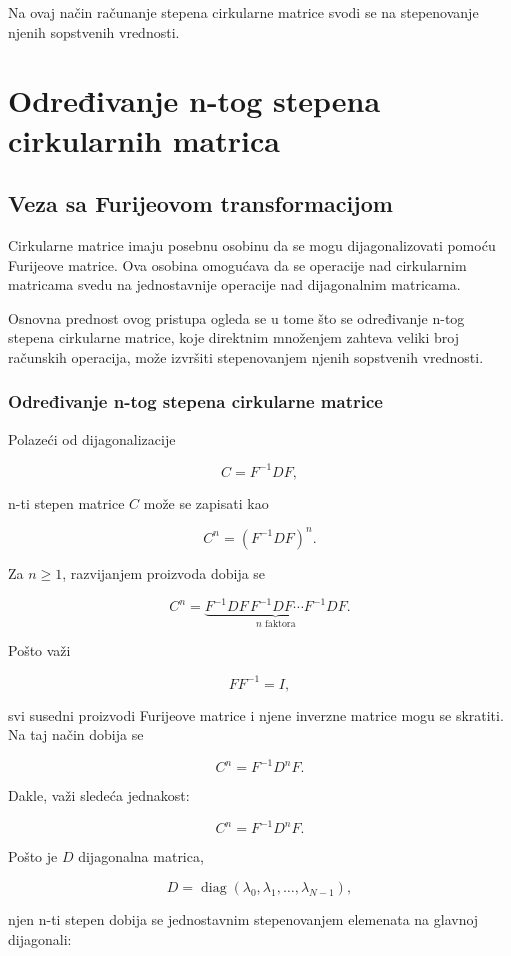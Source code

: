 \documentclass[12pt,a4paper]{report}
\begin{document}
Na ovaj način računanje stepena cirkularne matrice
svodi se na stepenovanje njenih sopstvenih vrednosti.

 
\chapter{Određivanje n-tog stepena cirkularnih matrica}

\section{Veza sa Furijeovom transformacijom}

Cirkularne matrice imaju posebnu osobinu da se mogu dijagonalizovati pomoću Furijeove matrice. Ova osobina omogućava da se operacije nad cirkularnim matricama svedu na jednostavnije operacije nad dijagonalnim matricama.

Osnovna prednost ovog pristupa ogleda se u tome što se određivanje n-tog stepena cirkularne matrice, koje direktnim množenjem zahteva veliki broj računskih operacija, može izvršiti stepenovanjem njenih sopstvenih vrednosti.

\subsection{Određivanje n-tog stepena cirkularne matrice}

Polazeći od dijagonalizacije

\[
C=F^{-1}DF,
\]

n-ti stepen matrice \(C\) može se zapisati kao

\[
C^n=(F^{-1}DF)^n.
\]

Za \(n\geq 1\), razvijanjem proizvoda dobija se

\[
C^n=
\underbrace{F^{-1}DF\,F^{-1}DF\cdots F^{-1}DF}_{n\text{ faktora}}.
\]

Pošto važi

\[
FF^{-1}=I,
\]

svi susedni proizvodi Furijeove matrice i njene inverzne matrice mogu se skratiti. Na taj način dobija se

\[
C^n=F^{-1}D^nF.
\]

Dakle, važi sledeća jednakost:

\[
\boxed{C^n=F^{-1}D^nF}.
\]

Pošto je \(D\) dijagonalna matrica,

\[
D=
\operatorname{diag}(\lambda_0,\lambda_1,\dots,\lambda_{N-1}),
\]

njen n-ti stepen dobija se jednostavnim stepenovanjem elemenata na glavnoj dijagonali:
\end{document}
